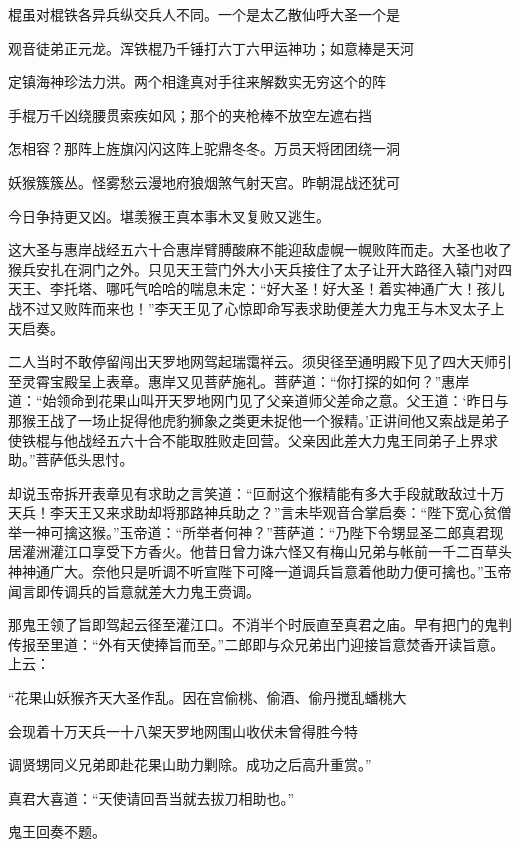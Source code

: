 \documentclass[12pt,UTF8]{ctexbook}
\begin{document}
{棍虽对棍铁各异兵纵交兵人不同。一个是太乙散仙呼大圣一个是

观音徒弟正元龙。浑铁棍乃千锤打六丁六甲运神功；如意棒是天河

定镇海神珍法力洪。两个相逢真对手往来解数实无穷这个的阵

手棍万千凶绕腰贯索疾如风；那个的夹枪棒不放空左遮右挡

怎相容？那阵上旌旗闪闪这阵上驼鼎冬冬。万员天将团团绕一洞

妖猴簇簇丛。怪雾愁云漫地府狼烟煞气射天宫。昨朝混战还犹可

今日争持更又凶。堪羡猴王真本事木叉复败又逃生。

这大圣与惠岸战经五六十合惠岸臂膊酸麻不能迎敌虚幌一幌败阵而走。大圣也收了猴兵安扎在洞门之外。只见天王营门外大小天兵接住了太子让开大路径入辕门对四天王、李托塔、哪吒气哈哈的喘息未定：“好大圣！好大圣！着实神通广大！孩儿战不过又败阵而来也！”李天王见了心惊即命写表求助便差大力鬼王与木叉太子上天启奏。

二人当时不敢停留闯出天罗地网驾起瑞霭祥云。须臾径至通明殿下见了四大天师引至灵霄宝殿呈上表章。惠岸又见菩萨施礼。菩萨道：“你打探的如何？”惠岸道：“始领命到花果山叫开天罗地网门见了父亲道师父差命之意。父王道：‘昨日与那猴王战了一场止捉得他虎豹狮象之类更未捉他一个猴精。’正讲间他又索战是弟子使铁棍与他战经五六十合不能取胜败走回营。父亲因此差大力鬼王同弟子上界求助。”菩萨低头思忖。

却说玉帝拆开表章见有求助之言笑道：“叵耐这个猴精能有多大手段就敢敌过十万天兵！李天王又来求助却将那路神兵助之？”言未毕观音合掌启奏：“陛下宽心贫僧举一神可擒这猴。”玉帝道：“所举者何神？”菩萨道：“乃陛下令甥显圣二郎真君现居灌洲灌江口享受下方香火。他昔日曾力诛六怪又有梅山兄弟与帐前一千二百草头神神通广大。奈他只是听调不听宣陛下可降一道调兵旨意着他助力便可擒也。”玉帝闻言即传调兵的旨意就差大力鬼王赍调。

那鬼王领了旨即驾起云径至灌江口。不消半个时辰直至真君之庙。早有把门的鬼判传报至里道：“外有天使捧旨而至。”二郎即与众兄弟出门迎接旨意焚香开读旨意。上云：

“花果山妖猴齐天大圣作乱。因在宫偷桃、偷酒、偷丹搅乱蟠桃大

会现着十万天兵一十八架天罗地网围山收伏未曾得胜今特

调贤甥同义兄弟即赴花果山助力剿除。成功之后高升重赏。”

真君大喜道：“天使请回吾当就去拔刀相助也。”

鬼王回奏不题。

}
\end{document}
